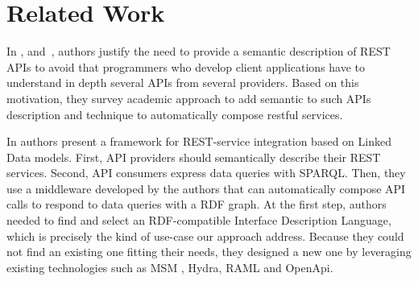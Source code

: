 \section{Related Work}

\vspace*{-0.2cm}




In \cite{verborgh_rest_2014}, and~\cite{7195633}, authors justify the need to provide a semantic description of REST APIs to avoid that programmers who develop client applications have to understand in depth several APIs from several providers. Based on this motivation, they survey academic approach to add semantic to such APIs description and technique to automatically compose restful services. %



In \cite{serrano2017linked} authors present a framework for REST-service integration based on Linked Data models. First, API providers should semantically describe their REST services. Second, API consumers express data queries with SPARQL. Then, they use a middleware developed by the authors that can automatically compose API calls to respond to data queries with a RDF graph.
At the first step, authors needed to find and select an RDF-compatible Interface Description Language, which is precisely the kind of use-case our approach address. Because they could not find an existing one fitting their needs, they designed a new one by leveraging existing technologies such as MSM \cite{pedrinaci2010toward}, Hydra, RAML and OpenApi. %

